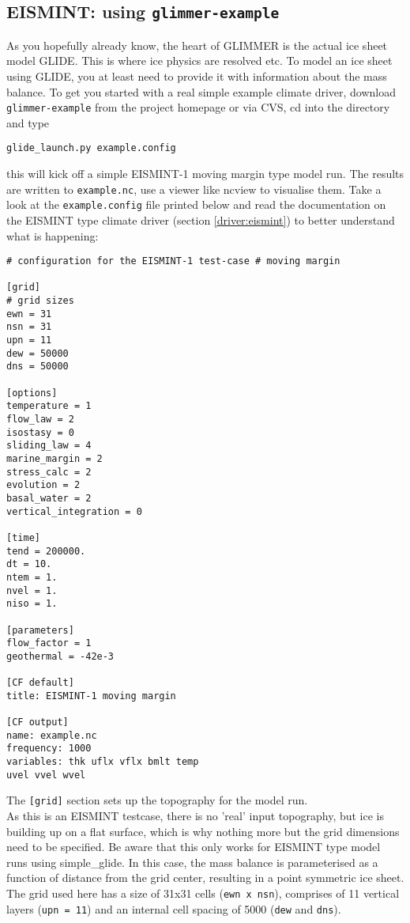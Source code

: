 
\subsection{EISMINT: using \texttt{glimmer-example}}
As you hopefully already know, the heart of GLIMMER is the actual ice sheet model
GLIDE. This is where ice physics are resolved etc. To model an ice sheet using
GLIDE, you at least need to provide it with information about the 
mass balance. To get you started with a real simple example climate driver,
download \texttt{glimmer-example} from the project homepage or via CVS, cd into
the directory and type
\begin{verbatim}
glide_launch.py example.config
\end{verbatim}
this will kick off a simple EISMINT-1 moving margin type model run. The results
are written to \texttt{example.nc}, use a viewer like ncview to visualise them.
Take a look at the \texttt{example.config} file printed below and read the documentation on
the EISMINT type climate driver (section \ref{driver:eismint}) to better understand what is happening:\\

\begin{verbatim}
# configuration for the EISMINT-1 test-case # moving margin

[grid]
# grid sizes
ewn = 31
nsn = 31
upn = 11
dew = 50000
dns = 50000

[options]
temperature = 1
flow_law = 2
isostasy = 0
sliding_law = 4
marine_margin = 2
stress_calc = 2
evolution = 2
basal_water = 2
vertical_integration = 0

[time]
tend = 200000.
dt = 10.
ntem = 1.
nvel = 1.
niso = 1.

[parameters]
flow_factor = 1
geothermal = -42e-3

[CF default]
title: EISMINT-1 moving margin

[CF output]
name: example.nc
frequency: 1000
variables: thk uflx vflx bmlt temp
uvel vvel wvel
\end{verbatim}

The \texttt{[grid]} section sets up the topography for the model run.\\
As this is an EISMINT testcase, there is no 'real' input topography, but ice is building up on a
flat surface, which is why nothing more but the grid dimensions need to be specified. Be aware that
this only works for EISMINT type model runs using simple_glide.
In this case, the mass balance is parameterised as a function of distance
from the grid center, resulting in a point symmetric ice sheet.
The grid used here has a size of 31x31 cells (\texttt{ewn x
nsn}), comprises of 11 vertical layers (\texttt{upn = 11}) and an internal cell spacing of
5000 (\texttt{dew} and \texttt{dns}).

